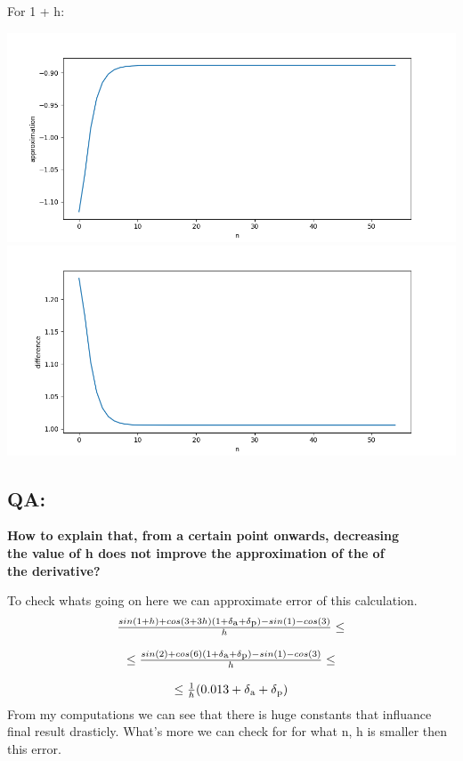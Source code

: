 \documentclass{article}
\begin{document}
For 1 + h:
\begin{center}
    \includegraphics[scale=0.5]{h_plus_1_approximation} 
    \includegraphics[scale=0.5]{h_plus_1_difference} 
\end{center}

\subsection*{QA:}

\begin{center}
    \textbf{How to explain that, from a certain point onwards, decreasing \\
    the value of h does not improve the approximation of the of \\
    the derivative?}
\end{center}
To check whats going on here we can approximate error of this calculation.
\[
    \begin{array}{c}
        \frac{sin(1+h) + cos(3+3h)(1 + \delta\textsubscript{a} +\delta\textsubscript{p}) - sin(1) - cos(3)}{h} \leq\\
        \\
        \leq\frac{sin(2) + cos(6)(1 + \delta\textsubscript{a} +\delta\textsubscript{p}) - sin(1) - cos(3)}{h}\leq\\
        \\
        \leq\frac{1}{h}(0.013 + \delta\textsubscript{a} +\delta\textsubscript{p})
    \end{array}
\]
From my computations we can see that there is huge constants that influance final result drasticly. What's more we can check for for what n, h is smaller then this error.
\end{document}
